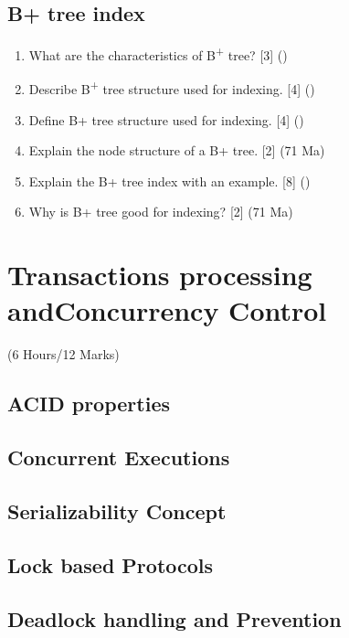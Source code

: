 \documentclass[12pt]{article}
\newcommand{\super}[1]{\textsuperscript{#1}}
\begin{document}
    \subsection{B+ tree index}
    		\begin{enumerate}[noitemsep, topsep=0pt]
    			\item What are the characteristics of B\super{+} tree? \hfill [3] ()
    			
    			\item Describe B\super{+} tree structure used for indexing. \hfill [4] ()
    			
    			\item Define B+ tree structure used for indexing. \hfill [4] ()
    			
    			\item Explain the node structure of a B+ tree. \hfill [2] (71 Ma)
    			
    			\item Explain the B+ tree index with an example. \hfill [8] ()
    			
    			\item Why is B+ tree good for indexing? \hfill [2] (71 Ma)
    		\end{enumerate}

    \pagebreak
\section{Transactions processing andConcurrency Control}
    \begin{center}(6 Hours/12 Marks)\end{center}
    \subsection{ACID properties}
    \subsection{Concurrent Executions}
    \subsection{Serializability Concept}
    \subsection{Lock based Protocols}
    \subsection{Deadlock handling and Prevention}
\end{document}
